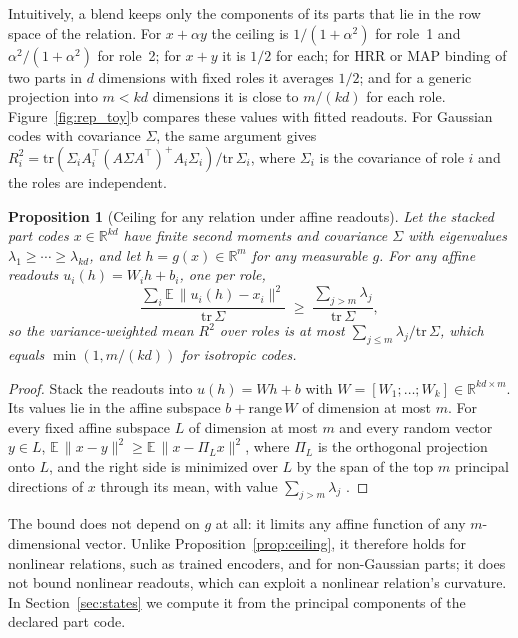 \documentclass[10pt]{article}
\theoremstyle{plain}
\newtheorem{proposition}{Proposition}
\theoremstyle{remark}
\newcommand{\R}{\mathbb{R}}
\begin{document}
\noindent
Intuitively, a blend keeps only the components of its parts that lie in the row space of the relation. For $x + \alpha y$ the ceiling is $1/(1 + \alpha^2)$ for role~1 and $\alpha^2/(1 + \alpha^2)$ for role~2; for $x + y$ it is $1/2$ for each; for HRR or MAP binding of two parts in $d$ dimensions with fixed roles it averages $1/2$; and for a generic projection into $m < kd$ dimensions it is close to $m/(kd)$ for each role. Figure~\ref{fig:rep_toy}b compares these values with fitted readouts. For Gaussian codes with covariance $\Sigma$, the same argument gives $R^2_i = \mathrm{tr}(\Sigma_i A_i^{\top}(A\Sigma A^{\top})^{+}A_i\Sigma_i)/\mathrm{tr}\,\Sigma_i$, where $\Sigma_i$ is the covariance of role $i$ and the roles are independent.

\begin{proposition}[Ceiling for any relation under affine readouts]
\label{prop:ey}
Let the stacked part codes $x \in \R^{kd}$ have finite second moments and covariance $\Sigma$ with eigenvalues $\lambda_1 \ge \cdots \ge \lambda_{kd}$, and let $h = g(x) \in \R^m$ for any measurable $g$. For any affine readouts $u_i(h) = W_i h + b_i$, one per role,
\begin{equation}
  \frac{\sum_i \mathbb{E}\,\lVert u_i(h) - x_i \rVert^2}{\mathrm{tr}\,\Sigma} \;\ge\; \frac{\sum_{j > m} \lambda_j}{\mathrm{tr}\,\Sigma},
\end{equation}
so the variance-weighted mean $R^2$ over roles is at most $\sum_{j \le m} \lambda_j / \mathrm{tr}\,\Sigma$, which equals $\min(1, m/(kd))$ for isotropic codes.
\end{proposition}

\begin{proof}
Stack the readouts into $u(h) = Wh + b$ with $W = [W_1; \ldots; W_k] \in \R^{kd \times m}$. Its values lie in the affine subspace $b + \mathrm{range}\,W$ of dimension at most $m$. For every fixed affine subspace $L$ of dimension at most $m$ and every random vector $y \in L$, $\mathbb{E}\,\lVert x - y \rVert^2 \ge \mathbb{E}\,\lVert x - \Pi_L x \rVert^2$, where $\Pi_L$ is the orthogonal projection onto $L$, and the right side is minimized over $L$ by the span of the top $m$ principal directions of $x$ through its mean, with value $\sum_{j > m} \lambda_j$ \citep{eckart1936}.
\end{proof}

\noindent
The bound does not depend on $g$ at all: it limits any affine function of any $m$-dimensional vector. Unlike Proposition~\ref{prop:ceiling}, it therefore holds for nonlinear relations, such as trained encoders, and for non-Gaussian parts; it does not bound nonlinear readouts, which can exploit a nonlinear relation's curvature. In Section~\ref{sec:states} we compute it from the principal components of the declared part code.
\end{document}
